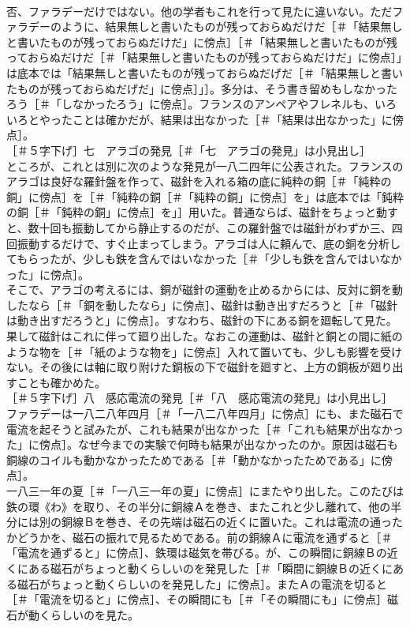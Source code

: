 \documentclass[8pt]{extreport}
\begin{document}
\begin{CJK}{UTF8}{min}
\\	否、ファラデーだけではない。他の学者もこれを行って見たに違いない。ただファラデーのように、結果無しと書いたものが残っておらぬだけだ［＃「結果無しと書いたものが残っておらぬだけだ」に傍点］［＃「結果無しと書いたものが残っておらぬだけだ［＃「結果無しと書いたものが残っておらぬだけだ」に傍点］」は底本では「結果無しと書いたものが残っておらぬだげだ［＃「結果無しと書いたものが残っておらぬだげだ」に傍点］」］。多分は、そう書き留めもしなかったろう［＃「しなかったろう」に傍点］。フランスのアンペアやフレネルも、いろいろとやったことは確かだが、結果は出なかった［＃「結果は出なかった」に傍点］。
\\	［＃５字下げ］七　アラゴの発見［＃「七　アラゴの発見」は小見出し］
\\	ところが、これとは別に次のような発見が一八二四年に公表された。フランスのアラゴは良好な羅針盤を作って、磁針を入れる箱の底に純粋の銅［＃「純粋の銅」に傍点］を［＃「純粋の銅［＃「純粋の銅」に傍点］を」は底本では「鈍粋の銅［＃「鈍粋の銅」に傍点］を」］用いた。普通ならば、磁針をちょっと動すと、数十回も振動してから静止するのだが、この羅針盤では磁針がわずか三、四回振動するだけで、すぐ止まってしまう。アラゴは人に頼んで、底の銅を分析してもらったが、少しも鉄を含んではいなかった［＃「少しも鉄を含んではいなかった」に傍点］。
\\	そこで、アラゴの考えるには、銅が磁針の運動を止めるからには、反対に銅を動したなら［＃「銅を動したなら」に傍点］、磁針は動き出すだろうと［＃「磁針は動き出すだろうと」に傍点］。すなわち、磁針の下にある銅を廻転して見た。果して磁針はこれに伴って廻り出した。なおこの運動は、磁針と銅との間に紙のような物を［＃「紙のような物を」に傍点］入れて置いても、少しも影響を受けない。その後には軸に取り附けた銅板の下で磁針を廻すと、上方の銅板が廻り出すことも確かめた。
\\	［＃５字下げ］八　感応電流の発見［＃「八　感応電流の発見」は小見出し］
\\	ファラデーは一八二八年四月［＃「一八二八年四月」に傍点］にも、また磁石で電流を起そうと試みたが、これも結果が出なかった［＃「これも結果が出なかった」に傍点］。なぜ今までの実験で何時も結果が出なかったのか。原因は磁石も銅線のコイルも動かなかったためである［＃「動かなかったためである」に傍点］。
\\	一八三一年の夏［＃「一八三一年の夏」に傍点］にまたやり出した。このたびは鉄の環《わ》を取り、その半分に銅線Ａを巻き、またこれと少し離れて、他の半分には別の銅線Ｂを巻き、その先端は磁石の近くに置いた。これは電流の通ったかどうかを、磁石の振れで見るためである。前の銅線Ａに電流を通ずると［＃「電流を通ずると」に傍点］、鉄環は磁気を帯びる。が、この瞬間に銅線Ｂの近くにある磁石がちょっと動くらしいのを発見した［＃「瞬間に銅線Ｂの近くにある磁石がちょっと動くらしいのを発見した」に傍点］。またＡの電流を切ると［＃「電流を切ると」に傍点］、その瞬間にも［＃「その瞬間にも」に傍点］磁石が動くらしいのを見た。

\end{CJK}
\end{document}
